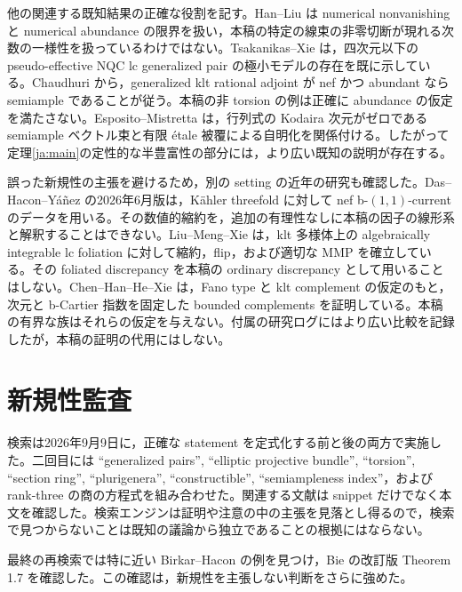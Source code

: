 \documentclass[12pt]{amsart}
\theoremstyle{definition}
\theoremstyle{remark}
\numberwithin{equation}{section}
\begin{document}
他の関連する既知結果の正確な役割を記す。Han--Liu \cite[Theorem 1.5 および \S3.3]{ja-HL} は numerical nonvanishing と numerical abundance の限界を扱い，本稿の特定の線束の非零切断が現れる次数の一様性を扱っているわけではない。Tsakanikas--Xie \cite[Corollary E]{ja-TX} は，四次元以下の pseudo-effective NQC lc generalized pair の極小モデルの存在を既に示している。Chaudhuri \cite[Theorem 2]{ja-Cha} から，generalized klt rational adjoint が nef かつ abundant なら semiample であることが従う。本稿の非 torsion の例は正確に abundance の仮定を満たさない。Esposito--Mistretta \cite[Theorem 3.10]{ja-EM} は，行列式の Kodaira 次元がゼロである semiample ベクトル束と有限 \'etale 被覆による自明化を関係付ける。したがって定理\ref{ja:main}の定性的な半豊富性の部分には，より広い既知の説明が存在する。

誤った新規性の主張を避けるため，別の setting の近年の研究も確認した。Das--Hacon--Y\'a\~nez \cite[Theorems 1.1--1.6]{ja-DHY} の2026年6月版は，K\"ahler threefold に対して nef b-$(1,1)$-current のデータを用いる。その数値的縮約を，追加の有理性なしに本稿の因子の線形系と解釈することはできない。Liu--Meng--Xie \cite[Theorems 1.2--1.4]{ja-LMX} は，klt 多様体上の algebraically integrable lc foliation に対して縮約，flip，および適切な MMP を確立している。その foliated discrepancy を本稿の ordinary discrepancy として用いることはしない。Chen--Han--He--Xie \cite[Theorem 1.1]{ja-CHHX} は，Fano type と klt complement の仮定のもと，次元と b-Cartier 指数を固定した bounded complements を証明している。本稿の有界な族はそれらの仮定を与えない。付属の研究ログにはより広い比較を記録したが，本稿の証明の代用にはしない。

\section{新規性監査}\label{ja:audit}
検索は2026年9月9日に，正確な statement を定式化する前と後の両方で実施した。二回目には ``generalized pairs'', ``elliptic projective bundle'', ``torsion'', ``section ring'', ``plurigenera'', ``constructible'', ``semiampleness index''，および rank-three の商の方程式を組み合わせた。関連する文献は snippet だけでなく本文を確認した。検索エンジンは証明や注意の中の主張を見落とし得るので，検索で見つからないことは既知の議論から独立であることの根拠にはならない。

最終の再検索では特に近い Birkar--Hacon の例を見つけ，Bie の改訂版 Theorem 1.7 を確認した。この確認は，新規性を主張しない判断をさらに強めた。
\end{document}
